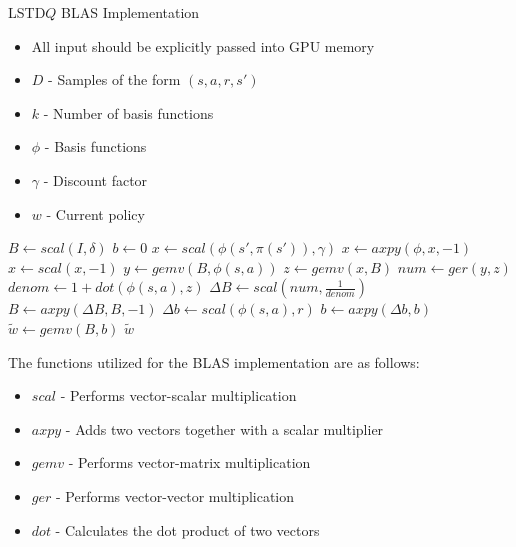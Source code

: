 \begin{algorithm}
\caption{LSTD$Q$ BLAS Implementation}
\label{lstdq:blas}
    {\fontsize{12}{10}\selectfont
    \begin{algorithmic}[1]
        \REQUIRE
            \begin{itemize} 
                \item All input should be explicitly passed into GPU memory
                \item $D$ - Samples of the form $(s,a,r,s')$ 
                \item $k$ - Number of basis functions
                \item $\phi$ - Basis functions
                \item $\gamma$ - Discount factor
                \item $w$ - Current policy
            \end{itemize}
        \STATE $B \leftarrow scal(I, \delta)$ 
        \STATE $b \leftarrow 0$ 
            \STATE $x \leftarrow scal(\phi(s',\pi(s')), \gamma)$
            \STATE $x \leftarrow axpy(\phi, x, -1)$
            \STATE $x \leftarrow scal(x, -1)$ 
            \STATE $y \leftarrow gemv(B, \phi(s,a))$
            \STATE $z \leftarrow gemv(x, B)$
            \STATE $num \leftarrow ger(y, z)$ 
            \STATE $denom \leftarrow 1 + dot(\phi(s,a), z)$ 
            \STATE $\Delta B \leftarrow scal(num, \frac{1}{denom})$
            \STATE $B \leftarrow axpy(\Delta B, B, -1)$
            \STATE $\Delta b \leftarrow scal(\phi(s,a), r)$
            \STATE $b \leftarrow axpy(\Delta b, b)$
        \ENDFOR
        \STATE $\tilde{w} \leftarrow gemv(B, b)$
        \RETURN $\tilde{w}$
    \end{algorithmic}
    }
\end{algorithm}

The functions utilized for the BLAS implementation are as follows:

{\fontsize{12}{5}\selectfont
\begin{itemize}
    \item $scal$ - Performs vector-scalar multiplication
    \item $axpy$ - Adds two vectors together with a scalar multiplier
    \item $gemv$ - Performs vector-matrix multiplication
    \item $ger$ - Performs vector-vector multiplication
    \item $dot$ - Calculates the dot product of two vectors
\end{itemize} 
}

